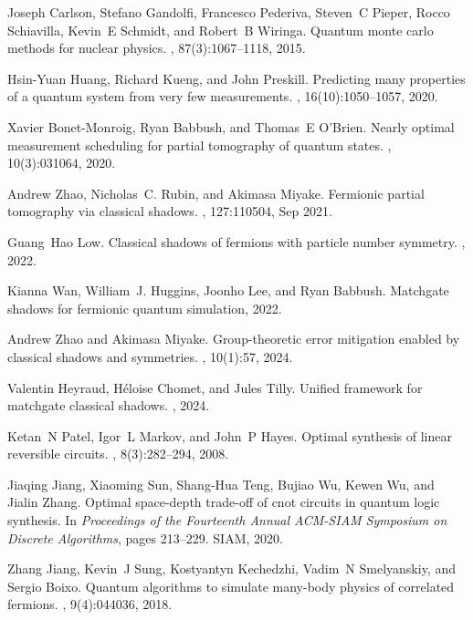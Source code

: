 \documentclass[showpacs,onecolumn,aps,prx,long bibliography,superscriptaddress,notitlepage]{revtex4-1}
\begin{document}
\begin{thebibliography}{10}
Joseph Carlson, Stefano Gandolfi, Francesco Pederiva, Steven~C Pieper, Rocco
  Schiavilla, Kevin~E Schmidt, and Robert~B Wiringa.
\newblock Quantum monte carlo methods for nuclear physics.
, 87(3):1067--1118, 2015.

Hsin-Yuan Huang, Richard Kueng, and John Preskill.
\newblock Predicting many properties of a quantum system from very few
  measurements.
, 16(10):1050--1057, 2020.

Xavier Bonet-Monroig, Ryan Babbush, and Thomas~E O’Brien.
\newblock Nearly optimal measurement scheduling for partial tomography of
  quantum states.
, 10(3):031064, 2020.

Andrew Zhao, Nicholas~C. Rubin, and Akimasa Miyake.
\newblock Fermionic partial tomography via classical shadows.
, 127:110504, Sep 2021.

Guang~Hao Low.
\newblock Classical shadows of fermions with particle number symmetry.
, 2022.

Kianna Wan, William~J. Huggins, Joonho Lee, and Ryan Babbush.
\newblock Matchgate shadows for fermionic quantum simulation, 2022.

Andrew Zhao and Akimasa Miyake.
\newblock Group-theoretic error mitigation enabled by classical shadows and
  symmetries.
, 10(1):57, 2024.

Valentin Heyraud, H{\'e}loise Chomet, and Jules Tilly.
\newblock Unified framework for matchgate classical shadows.
, 2024.

Ketan~N Patel, Igor~L Markov, and John~P Hayes.
\newblock Optimal synthesis of linear reversible circuits.
, 8(3):282--294, 2008.

Jiaqing Jiang, Xiaoming Sun, Shang-Hua Teng, Bujiao Wu, Kewen Wu, and Jialin
  Zhang.
\newblock Optimal space-depth trade-off of cnot circuits in quantum logic
  synthesis.
\newblock In {\em Proceedings of the Fourteenth Annual ACM-SIAM Symposium on
  Discrete Algorithms}, pages 213--229. SIAM, 2020.

Zhang Jiang, Kevin~J Sung, Kostyantyn Kechedzhi, Vadim~N Smelyanskiy, and
  Sergio Boixo.
\newblock Quantum algorithms to simulate many-body physics of correlated
  fermions.
, 9(4):044036, 2018.


\end{thebibliography}
\end{document}
